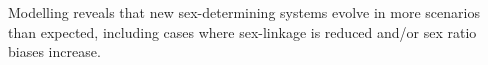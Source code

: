 \documentclass[10pt,letterpaper]{article}
\begin{document}
\noindent Modelling reveals that new sex-determining systems evolve in more scenarios than expected, including cases where sex-linkage is reduced and/or sex ratio biases increase.
\end{document}
